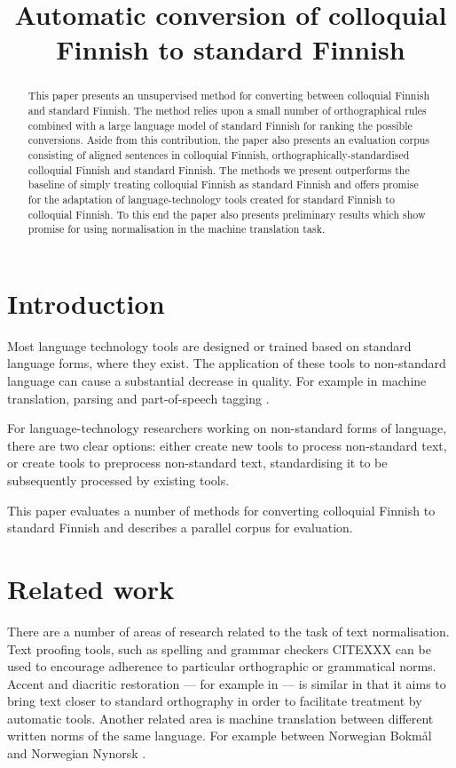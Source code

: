 \documentclass[11pt]{article}
\title{Automatic conversion of colloquial Finnish to standard Finnish}
\author{}
\date{}
\begin{document}
\maketitle
\begin{abstract}
  This paper presents an unsupervised method for converting between colloquial Finnish
  and standard Finnish. The method relies upon a small number of orthographical rules
  combined with a large language model of standard Finnish for ranking the possible 
  conversions. Aside from this contribution, the paper also presents an evaluation
  corpus consisting of aligned sentences in colloquial Finnish, orthographically-standardised
  colloquial Finnish and standard Finnish. The methods we present outperforms the baseline
  of simply treating colloquial Finnish as standard Finnish and offers promise for the adaptation
  of language-technology tools created for standard Finnish to colloquial Finnish. To this end
  the paper also presents preliminary results which show promise for using normalisation in 
  the machine translation task.
\end{abstract}

\section{Introduction}

Most language technology tools are designed or trained based on standard language 
forms, where they exist. The application of these tools to non-standard
language can cause a substantial decrease in quality. For example in machine translation,
parsing and part-of-speech tagging \cite{eisenstein2013}.

For language-technology researchers working on non-standard forms of language, there are 
two clear options: either create new tools to process non-standard text,
  or create tools to preprocess non-standard text, standardising it to be subsequently processed
 by existing tools.

This paper evaluates a number of methods for converting colloquial Finnish to standard Finnish and describes a parallel corpus for evaluation.

\section{Related work}

There are a number of areas of research related to the task of text normalisation. Text
proofing tools, such as spelling and grammar checkers CITEXXX can be used to encourage adherence
to particular orthographic or grammatical norms. Accent and diacritic restoration --- for example in  --- is similar
in that it aims to bring text closer to standard orthography in order to facilitate treatment by 
automatic tools. Another related area is machine translation between different written norms of 
the same language. For example between Norwegian Bokm\aa{}l and Norwegian Nynorsk \cite{unhammer2009}.
\end{document}
